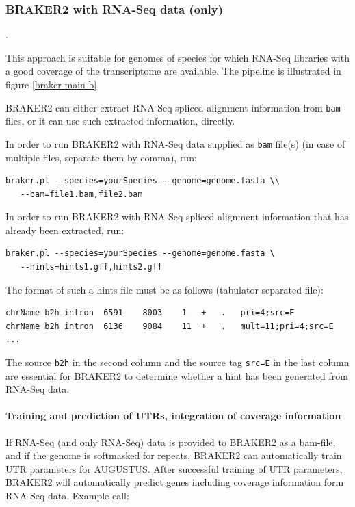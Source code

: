 \documentclass[]{article}
\let\oldparagraph\paragraph
\renewcommand{\paragraph}[1]{\oldparagraph{#1}\mbox{}}
\begin{document}
\subsubsection{BRAKER2 with RNA-Seq data (only)}\label{braker1}

.

This approach is suitable for genomes of species for which RNA-Seq
libraries with a good coverage of the transcriptome are available. The
pipeline is illustrated in figure \ref{braker-main-b}.

BRAKER2 can either extract RNA-Seq spliced alignment information from
\texttt{bam} files, or it can use such extracted information, directly.

In order to run BRAKER2 with RNA-Seq data supplied as \texttt{bam}
file(s) (in case of multiple files, separate them by comma), run:

\begin{verbatim}
braker.pl --species=yourSpecies --genome=genome.fasta \\
   --bam=file1.bam,file2.bam
\end{verbatim}

In order to run BRAKER2 with RNA-Seq spliced alignment information that
has already been extracted, run:

\begin{verbatim}
braker.pl --species=yourSpecies --genome=genome.fasta \
   --hints=hints1.gff,hints2.gff
\end{verbatim}

The format of such a hints file must be as follows (tabulator separated
file):

\begin{verbatim}
chrName b2h intron  6591    8003    1   +   .   pri=4;src=E
chrName b2h intron  6136    9084    11  +   .   mult=11;pri=4;src=E
...
\end{verbatim}

The source \texttt{b2h} in the second column and the source tag
\texttt{src=E} in the last column are essential for BRAKER2 to determine
whether a hint has been generated from RNA-Seq data.

\paragraph{Training and prediction of UTRs, integration of coverage
information}\label{training-and-prediction-of-utrs-integration-of-coverage-information}

If RNA-Seq (and only RNA-Seq) data is provided to BRAKER2 as a bam-file,
and if the genome is softmasked for repeats, BRAKER2 can automatically
train UTR parameters for AUGUSTUS. After successful training of UTR
parameters, BRAKER2 will automatically predict genes including coverage
information form RNA-Seq data. Example call:
\end{document}

